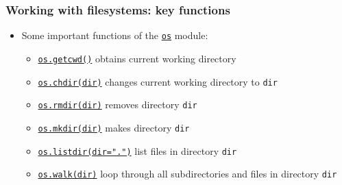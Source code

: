 \documentclass[xcolor=table]{beamer}
\begin{document}
\begin{frame}[fragile]
    \frametitle{Working with filesystems: key functions}
\begin{itemize}\addtolength{\itemsep}{\baselineskip}
        \item Some important functions of the \href{https://docs.python.org/3.7/library/os.html#module-os}{\texttt{os}} module:\pause
            \begin{itemize}\addtolength{\itemsep}{\baselineskip}
                \item \href{https://docs.python.org/3.7/library/os.html#os.getcwd}{\texttt{os.getcwd()}} obtains current working directory \pause
                \item \href{https://docs.python.org/3.7/library/os.html#os.chdir}{\texttt{os.chdir(dir)}} changes current working directory to \texttt{dir} \pause
                \item \href{https://docs.python.org/3.7/library/os.html#os.rmdir}{\texttt{os.rmdir(dir)}} removes directory \texttt{dir} \pause
                \item \href{https://docs.python.org/3.7/library/os.html#os.mkdir}{\texttt{os.mkdir(dir)}} makes directory \texttt{dir} \pause
                \item \href{https://docs.python.org/3.7/library/os.html#os.listdir}{\texttt{os.listdir(dir=".")}} list files in directory \texttt{dir} \pause
                \item \href{https://docs.python.org/3.7/library/os.html#os.walk}{\texttt{os.walk(dir)}} loop through all subdirectories and files in directory \texttt{dir} \pause
        \end{itemize}
    \end{itemize}
\end{frame}

\end{document}

